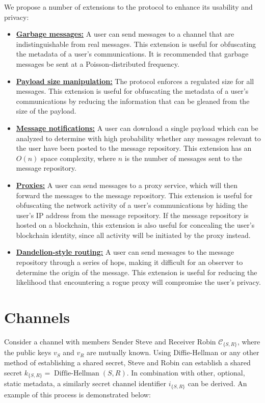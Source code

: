 We propose a number of extensions to the protocol to enhance its usability and privacy:

\begin{itemize}
\item
    \hyperref[garbage-messages]{\textbf{Garbage messages:}} A user can send messages to a channel that are indistinguishable from real messages. This extension is useful for obfuscating the metadata of a user's communications. It is recommended that garbage messages be sent at a Poisson-distributed frequency.
\item
    \hyperref[payload-size]{\textbf{Payload size manipulation:}} The protocol enforces a regulated size for all messages. This extension is useful for obfuscating the metadata of a user's communications by reducing the information that can be gleaned from the size of the payload.
\item
    \hyperref[message-notifications]{\textbf{Message notifications:}} A user can download a single payload which can be analyzed to determine with high probability whether any messages relevant to the user have been posted to the message repository. This extension has an $O(n)$ space complexity, where $n$ is the number of messages sent to the message repository.
\item
    \hyperref[proxies]{\textbf{Proxies:}} A user can send messages to a proxy service, which will then forward the messages to the message repository. This extension is useful for obfuscating the network activity of a user's communications by hiding the user's IP address from the message repository. If the message repository is hosted on a blockchain, this extension is also useful for concealing the user's blockchain identity, since all activity will be initiated by the proxy instead.
\item
    \hyperref[dandelion-style-routing]{\textbf{Dandelion-style routing:}} A user can send messages to the message repository through a series of hops, making it difficult for an observer to determine the origin of the message. This extension is useful for reducing the likelihood that encountering a rogue proxy will compromise the user's privacy.
\end{itemize}

\section{Channels}\label{channels}

Consider a channel with members Sender Steve and Receiver Robin $\mathcal{C}_{\{S,R\}}$, where the public keys $v_S$ and $v_R$ are mutually known. Using Diffie-Hellman or any other method of establishing a shared secret, Steve and Robin can establish a shared secret $k_{\{S,R\}} = \operatorname{Diffie-Hellman}(S, R)$. In combination with other, optional, static metadata, a similarly secret channel identifier $i_{\{S,R\}}$ can be derived. An example of this process is demonstrated below:

